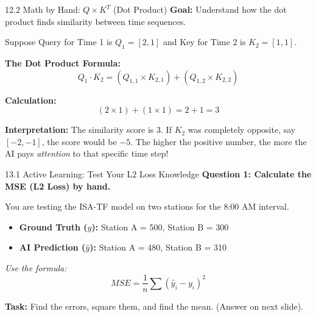 \documentclass[aspectratio=169]{beamer}
\begin{document}
\begin{frame}{12.2 Math by Hand: $Q \times K^T$ (Dot Product)}
  \textbf{Goal:} Understand how the dot product finds similarity between time sequences. 
  
  Suppose Query for Time 1 is $Q_1 = [2, 1]$ and Key for Time 2 is $K_2 = [1, 1]$.
  
  \vspace{0.3cm}
  \textbf{The Dot Product Formula:}
  $$ Q_1 \cdot K_2 = (Q_{1,1} \times K_{2,1}) + (Q_{1,2} \times K_{2,2}) $$
  
  \textbf{Calculation:}
  $$ (2 \times 1) + (1 \times 1) = 2 + 1 = 3 $$
  
  \vspace{0.3cm}
  \textbf{Interpretation:}
  The similarity score is $3$. If $K_2$ was completely opposite, say $[-2, -1]$, the score would be $-5$. The higher the positive number, the more the AI pays \textit{attention} to that specific time step!
\end{frame}


\begin{frame}{13.1 Active Learning: Test Your L2 Loss Knowledge}
  \textbf{Question 1: Calculate the MSE (L2 Loss) by hand.}
  
  You are testing the ISA-TF model on two stations for the 8:00 AM interval.
  \begin{itemize}
      \item \textbf{Ground Truth ($y$):} Station A = 500, Station B = 300
      \item \textbf{AI Prediction ($\hat{y}$):} Station A = 480, Station B = 310
  \end{itemize}
  
  \vspace{0.4cm}
  \textit{Use the formula:}
  $$ MSE = \frac{1}{n} \sum (\hat{y}_i - y_i)^2 $$
  
  \vspace{0.4cm}
  \textbf{Task:} Find the errors, square them, and find the mean. (Answer on next slide).
\end{frame}
\end{document}
